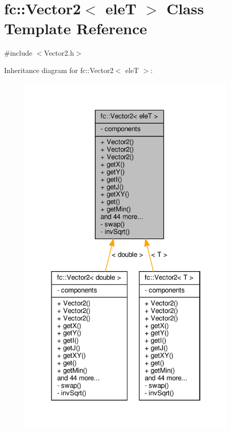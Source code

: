 \hypertarget{classfc_1_1Vector2}{}\section{fc\+:\+:Vector2$<$ eleT $>$ Class Template Reference}
\label{classfc_1_1Vector2}


{\ttfamily \#include $<$Vector2.\+h$>$}



Inheritance diagram for fc\+:\+:Vector2$<$ eleT $>$\+:
\nopagebreak
\begin{figure}[H]
\begin{center}
\leavevmode
\includegraphics[width=298pt]{d1/d76/classfc_1_1Vector2__inherit__graph}
\end{center}
\end{figure}


